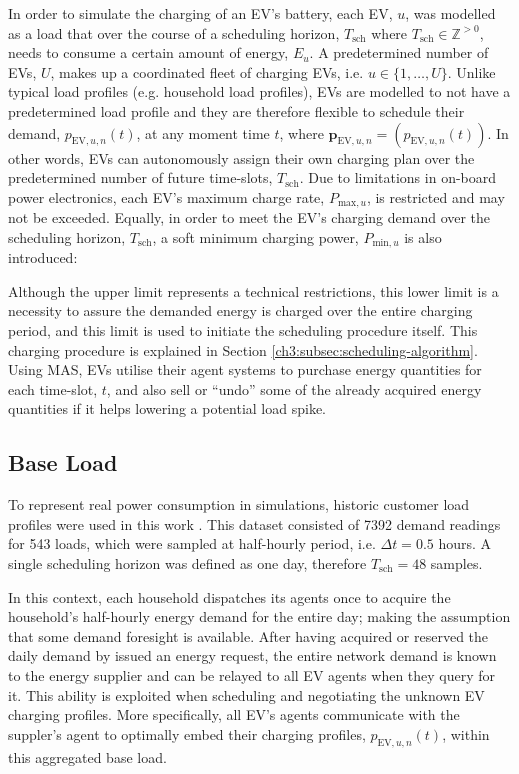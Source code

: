 In order to simulate the charging of an EV's battery, each EV, $u$, was modelled as a load that over the course of a scheduling horizon, $T_\text{sch}$ where $T_\text{sch} \in \mathbb{Z}^{>0}$, needs to consume a certain amount of energy, $E_u$.
A predetermined number of EVs, $U$, makes up a coordinated fleet of charging EVs, i.e. $u \in \{1, \dots, U\}$.
Unlike typical load profiles (e.g. household load profiles), EVs are modelled to not have a predetermined load profile and they are therefore flexible to schedule their demand, $p_{\text{EV},u,n}(t)$, at any moment time $t$, where $\textbf{p}_{\text{EV},u,n} = (p_{\text{EV},u,n}(t))$.
In other words, EVs can autonomously assign their own charging plan over the predetermined number of future time-slots, $T_\text{sch}$.
Due to limitations in on-board power electronics, each EV's maximum charge rate, $P_{\text{max},u}$, is restricted and may not be exceeded.
Equally, in order to meet the EV's charging demand over the scheduling horizon, $T_\text{sch}$, a soft minimum charging power, $P_{\text{min},u}$ is also introduced:



Although the upper limit represents a technical restrictions, this lower limit is a necessity to assure the demanded energy is charged over the entire charging period, and this limit is used to initiate the scheduling procedure itself.
This charging procedure is explained in Section \ref{ch3:subsec:scheduling-algorithm}.
Using MAS, EVs utilise their agent systems to purchase energy quantities for each time-slot, $t$, and also sell or ``undo'' some of the already acquired energy quantities if it helps lowering a potential load spike.

\subsection{Base Load}


To represent real power consumption in simulations, historic customer load profiles were used in this work \cite{IrishData2002}.
This dataset consisted of 7392 demand readings for 543 loads, which were sampled at half-hourly period, i.e. $\Delta t = 0.5$ hours.
A single scheduling horizon was defined as one day, therefore $T_\text{sch}=48$ samples.

In this context, each household dispatches its agents once to acquire the household's half-hourly energy demand for the entire day; making the assumption that some demand foresight is available.
After having acquired or reserved the daily demand by issued an energy request, the entire network demand is known to the energy supplier and can be relayed to all EV agents when they query for it.
This ability is exploited when scheduling and negotiating the unknown EV charging profiles.
More specifically, all EV's agents communicate with the suppler's agent to optimally embed their charging profiles, $p_{\text{EV},u,n}(t)$, within this aggregated base load.

